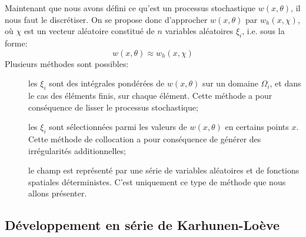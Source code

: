 Maintenant que nous avons défini ce qu'est un processus stochastique $w(x,\theta)$, il nous faut le discrétiser.
On se propose donc d'approcher $w(x,\theta)$ par $w_h(x,\chi)$, où $\chi$ est un vecteur aléatoire constitué de $n$ variables aléatoires $\xi_i$, i.e. sous la forme:
\begin{equation}
w(x,\theta)\approx w_h(x,\chi)
\end{equation}
Plusieurs méthodes sont possibles:
\begin{description}
   \item[] les $\xi_i$ sont des intégrales pondérées de $w(x,\theta)$ sur un domaine $\Omega_i$, et dans le cas des éléments finis, sur chaque élément. Cette méthode a pour conséquence de lisser le processus stochastique;
   \item[] les $\xi_i$ sont sélectionnées parmi les valeurs de $w(x,\theta)$ en certains points $x$. Cette méthode de collocation a pour conséquence de générer des irrégularités additionnelles;
   \item[] le champ est représenté par une série de variables aléatoires et de fonctions spatiales déterministes. C'est uniquement ce type de méthode que nous allons présenter.
\end{description}


\medskip\ifVersionDuDocEstVincent\else\newpage\fi
\subsection{Développement en série de Karhunen-Loève}

